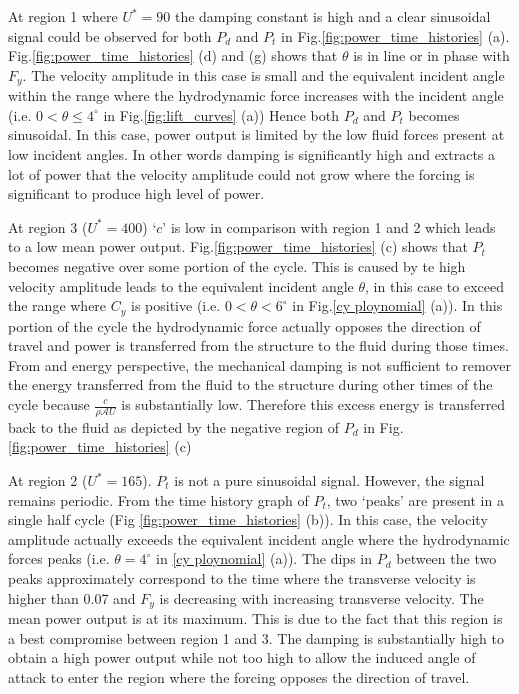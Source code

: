  
 
 
 At region 1 where $U^*=90$ the damping constant is high and a clear sinusoidal signal could be observed for both $P_d$ and $P_t$ in Fig.\ref{fig:power_time_histories} (a). Fig.\ref{fig:power_time_histories} (d) and (g) shows that $\theta$ is in line or in phase with $F_y$.  The velocity amplitude in this case is small and the equivalent incident angle within the range where the hydrodynamic force increases with the incident angle (i.e. $0<\theta \leq 4^\circ$ in Fig.\ref{fig:lift_curves} (a)) Hence both $P_d$ and $P_t$ becomes sinusoidal. In this case, power output is limited by the low fluid forces present at low incident angles. In other words damping is significantly high and extracts a lot of power that the velocity amplitude could not grow where the forcing  is significant to produce high level of power.   
 
 
  At region 3 ($U^*= 400$) `$c$' is low in comparison with region 1 and 2 which leads to a low mean power output. Fig.\ref{fig:power_time_histories} (c) shows that $P_t$ becomes negative over some portion of the cycle. This is caused by te high velocity amplitude leads to the equivalent incident angle $\theta$, in this case to exceed the range where $C_y$ is positive (i.e. $0<\theta<6^\circ$ in Fig.\ref{cy ploynomial} (a)). In this portion of the cycle the hydrodynamic force actually opposes the direction of travel and power is transferred from the structure to the fluid during those times. From and energy perspective, the mechanical damping is not sufficient to remover the energy transferred from the fluid to the structure during other times of the cycle because $\frac{c}{\rho\mathcal{A}U}$ is substantially low. Therefore this excess energy is transferred back to the fluid as depicted by the negative region of $P_d$ in Fig.\ref{fig:power_time_histories} (c) 
 

At region 2 ($U^*=165$). $P_t$ is not a pure sinusoidal signal. However, the  signal remains periodic. From the time history graph of $P_t$, two `peaks' are present in a single half cycle (Fig \ref{fig:power_time_histories} (b)). In this case, the velocity amplitude actually exceeds the equivalent incident angle where the hydrodynamic forces peaks (i.e. $\theta=4^\circ$ in \ref{cy ploynomial} (a)). The dips in $P_d$ between the two peaks approximately correspond to the time where the transverse velocity is higher than 0.07 and $F_y$ is decreasing with increasing transverse velocity. The mean power output is at its maximum. This is due to the fact that this region is a best compromise between region 1 and 3. The damping is substantially high to obtain a high power output while not too high to allow the induced angle of attack to enter the region where the forcing opposes the direction of travel. 


